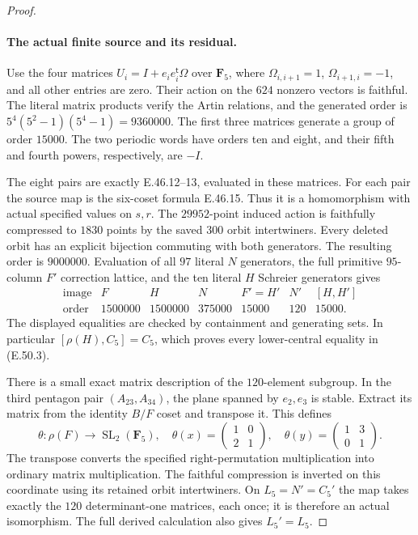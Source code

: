 \begin{proof}
\paragraph{The actual finite source and its residual.}
Use the four matrices
$U_i=I+e_i e_i^{\mathsf t}\Omega$ over $\mathbf F_5$,
where $\Omega_{i,i+1}=1$, $\Omega_{i+1,i}=-1$, and
all other entries are zero.  Their action on the $624$
nonzero vectors is faithful.  The literal matrix products
verify the Artin relations, and the generated order is
$5^4(5^2-1)(5^4-1)=9360000$.
The first three matrices generate a group of order $15000$.
The two periodic words have orders ten and eight, and
their fifth and fourth powers, respectively, are $-I$.

The eight pairs are exactly E.46.12--13, evaluated in
these matrices.  For each pair the source map is the
six-coset formula E.46.15.  Thus it is a homomorphism
with actual specified values on $s,r$.
The $29952$-point induced action is faithfully compressed
to $1830$ points by the saved $300$ orbit intertwiners.
Every deleted orbit has an explicit bijection commuting
with both generators.  The resulting order is $9000000$.
Evaluation of all $97$ literal $N$ generators, the full
primitive $95$-column $F'$ correction lattice, and the
ten literal $H$ Schreier generators gives
\[
 \begin{array}{c|rrrrrr}
  \text{image}&F&H&N&F'=H'&N'&[H,H']\\ \hline
  \text{order}&1500000&1500000&375000&15000&120&15000.
 \end{array}
 \tag{E.50.7}
\]
The displayed equalities are checked by containment
and generating sets.  In particular $[\rho(H),C_5]=C_5$,
which proves every lower-central equality in
\textup{(E.50.3)}.

There is a small exact matrix description of the
$120$-element subgroup.  In the third pentagon pair
$(A_{23},A_{34})$, the plane spanned by $e_2,e_3$ is
stable.  Extract its matrix from the identity $B/F$
coset and transpose it.  This defines
\[
 \theta:\rho(F)\longrightarrow\operatorname{SL}_2(\mathbf F_5),
 \quad
 \theta(x)=\begin{pmatrix}1&0\\2&1\end{pmatrix},
 \quad
 \theta(y)=\begin{pmatrix}1&3\\0&1\end{pmatrix}.
 \tag{E.50.8}
\]
The transpose converts the specified right-permutation
multiplication into ordinary matrix multiplication.
The faithful compression is inverted on this coordinate
using its retained orbit intertwiners.  On $L_5=N'=C_5'$
the map takes exactly the $120$ determinant-one matrices,
each once; it is therefore an actual isomorphism.
The full derived calculation also gives $L_5'=L_5$.


\end{proof}
